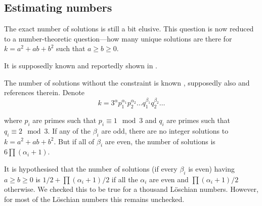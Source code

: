 \subsection{Estimating numbers}
	The exact number of solutions is still a bit elusive. This question is now reduced to a number-theoretic question---how many unique solutions are there for $k=a^2+ab+b^2$ such that $a\geq b\geq 0$.
	
	It is supposedly known \cite{oeisA088534} and reportedly shown in \cite{berndt1992fitzroy}.

	The number of solutions without the constraint is known \cite{marmon2005hexagonal}, supposedly also \cite{hirschhorn2008fitzroy} and references therein. Denote
	\begin{equation}
		k=3^\alpha p_1^{\alpha_1}p_2^{\alpha_2}\ldots q_1^{\beta_1}q_2^{\beta_2}\ldots
	\end{equation}
	
	where $p_i$ are primes such that $p_i \equiv 1 \mod 3$ and $q_i$ are primes such that $q_i \equiv 2 \mod 3$. If any of the $\beta_i$ are odd, there are no integer solutions to $k=a^2+ab+b^2$. But if all of $\beta_i$ are even, the number of solutions is $6\prod (\alpha_i +1)$.
	
	It is hypothesised \cite{nair2004elementary} that the number of solutions (if every $\beta_i$ is even) having $a \geq b \geq 0$ is $1/2 + \prod (\alpha_i +1)/2$ if all the $\alpha_i$ are even and $\prod (\alpha_i +1)/2$ otherwise. We checked this to be true for a thousand Löschian numbers. However, for most of the Löschian numbers this remains unchecked.
